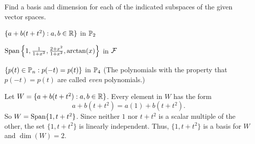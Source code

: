 \begin{example} Find a basis and dimension for each of the indicated subspaces of the given vector spaces.
	\ba
	\item $\{a+b(t+t^2) : a, b \in \mathbb{R}\}$ in $\mathbb{P}_2$
	
	\item $\text{Span}\left\{1, \frac{1}{1+x^2}, \frac{2+x^2}{1+x^2}, \arctan(x)\right\}$ in $\mathcal{F}$
	
	\item $\{p(t) \in \mathbb{P}_n : p(-t) = p(t)\}$ in $\mathbb{P}_4$ (The polynomials with the property that $p(-t) = p(t)$ are called \emph{even} polynomials.)
	
	\ea

\ExampleSolution
	\ba
	\item Let $W = \{a+b(t+t^2) : a, b \in \mathbb{R}\}$. Every element in $W$ has the form 
	\[a+b(t+t^2) = a(1) + b(t+t^2).\]
	So $W = \text{Span}\{1, t+t^2\}$. Since neither $1$ nor $t+t^2$ is a scalar multiple of the other, the set $\{1, t+t^2\}$ is linearly independent. Thus, $\{1, t+t^2\}$ is a basis for $W$ and $\dim(W) = 2$. 
	

\end{example}
